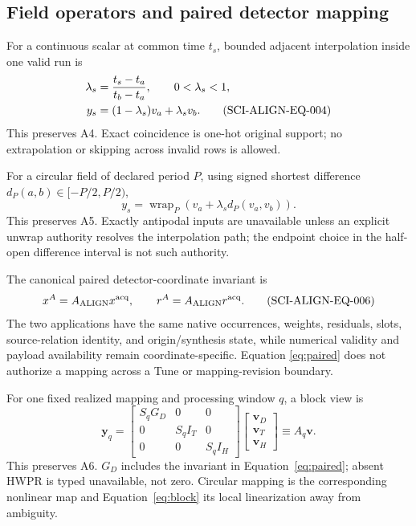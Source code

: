 \subsection{Field operators and paired detector mapping}

For a continuous scalar at common time \(t_s\), bounded adjacent
interpolation inside one valid run is
\begin{align}
 \lambda_s&=\frac{t_s-t_a}{t_b-t_a},\qquad 0<\lambda_s<1,\notag\\
 y_s&=(1-\lambda_s)v_a+\lambda_s v_b.
 \tag{SCI-ALIGN-EQ-004}\label{eq:linear}
\end{align}
\noindent This preserves A4.  Exact coincidence is one-hot original support;
no extrapolation or skipping across invalid rows is allowed.

For a circular field of declared period \(P\), using signed shortest
difference \(d_P(a,b)\in[-P/2,P/2)\),
\begin{equation}
 y_s=\operatorname{wrap}_P\!\left(v_a+\lambda_s d_P(v_a,v_b)\right).
 \tag{SCI-ALIGN-EQ-005}\label{eq:circular}
\end{equation}
\noindent This preserves A5.  Exactly antipodal inputs are unavailable unless
an explicit unwrap authority resolves the interpolation path; the endpoint
choice in the half-open difference interval is not such authority.

The canonical paired detector-coordinate invariant is
\begin{equation}
 x^A=A_{\rm ALIGN}x^{\rm acq},
 \qquad
 r^A=A_{\rm ALIGN}r^{\rm acq}.
 \tag{SCI-ALIGN-EQ-006}\label{eq:paired}
\end{equation}
The two applications have the same native occurrences, weights, residuals,
slots, source-relation identity, and origin/synthesis state, while numerical
validity and payload availability remain coordinate-specific.  Equation
\ref{eq:paired} does not authorize a mapping across a Tune or mapping-revision
boundary.

For one fixed realized mapping and processing window \(q\), a block view is
\begin{equation}
 \boldsymbol y_q=
 \begin{bmatrix}
 S_qG_D&0&0\\
 0&S_qI_T&0\\
 0&0&S_qI_H
 \end{bmatrix}
 \begin{bmatrix}
 \boldsymbol v_D\\ \boldsymbol v_T\\ \boldsymbol v_H
 \end{bmatrix}
 \equiv A_q\boldsymbol v .
 \tag{SCI-ALIGN-EQ-007}\label{eq:block}
\end{equation}
\noindent This preserves A6.  \(G_D\) includes the invariant in
Equation~\ref{eq:paired}; absent HWPR is typed unavailable, not zero.  Circular
mapping is the corresponding nonlinear map and Equation~\ref{eq:block} its
local linearization away from ambiguity.

